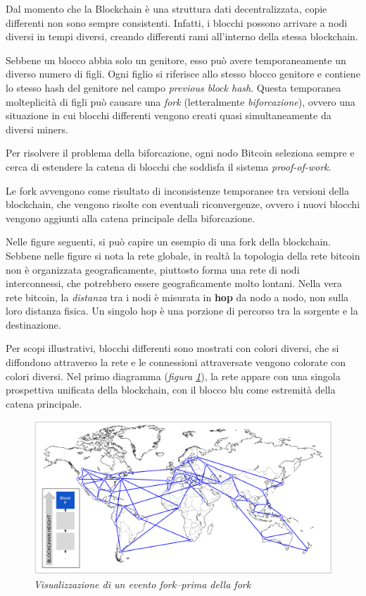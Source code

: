 Dal momento che la Blockchain è una struttura dati decentralizzata, copie differenti non sono sempre consistenti. Infatti, i blocchi possono arrivare a nodi diversi in tempi diversi, creando differenti rami all'interno della stessa blockchain.

Sebbene un blocco abbia solo un genitore, esso può avere temporaneamente un diverso numero di figli. Ogni figlio si riferisce allo stesso blocco genitore e contiene lo stesso hash del genitore nel campo  \textit{previous block hash}. Questa temporanea molteplicità di figli può causare una \textit{fork} (letteralmente \textit{biforcazione}), ovvero una situazione in cui blocchi differenti vengono creati quasi simultaneamente da diversi miners.

Per risolvere il problema della biforcazione, ogni nodo Bitcoin seleziona sempre e cerca di estendere la catena di blocchi che soddisfa il sistema \textit{proof-of-work}.

Le fork avvengono come risultato di inconsistenze temporanee tra versioni della blockchain,
che vengono risolte con eventuali riconvergenze, ovvero i nuovi blocchi vengono aggiunti alla catena principale della biforcazione.

Nelle figure seguenti, si può capire un esempio di una fork della blockchain. Sebbene nelle figure si nota la rete globale, in realtà la topologia della rete bitcoin non è organizzata geograficamente, piuttosto forma una rete di nodi interconnessi, che potrebbero essere geograficamente molto lontani. Nella vera rete bitcoin, la \textit{distanza} tra i nodi è misurata in \textbf{hop} da nodo a nodo, non sulla loro distanza fisica. Un singolo hop è una porzione di percorso tra la sorgente e la destinazione. 

Per scopi illustrativi, blocchi differenti sono mostrati con colori diversi, che si diffondono attraverso la rete e le connessioni attraversate vengono colorate con colori diversi.
Nel primo diagramma (\textit{figura \ref{fig:fork1}}), la rete appare con una singola prospettiva unificata della blockchain, con il blocco blu come estremità della catena principale.
\begin{figure}[h]
	\centering
	\includegraphics[width=0.85 \linewidth]{figure/fork1}
	\caption{\textit{Visualizzazione di un evento fork--prima della fork} \label{fig:fork1}}
\end{figure}

